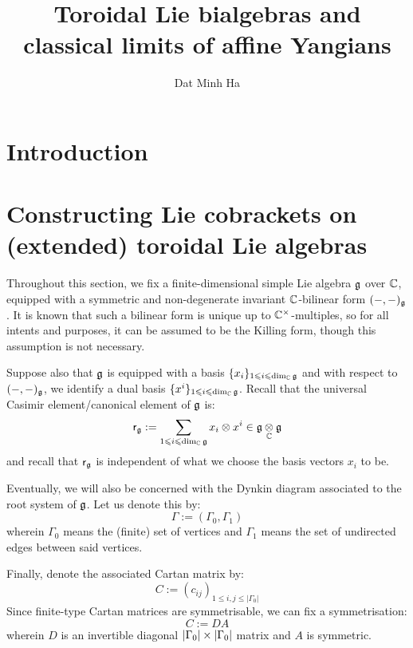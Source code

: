 

\setcounter{section}{-1}





    \title{Toroidal Lie bialgebras and classical limits of affine Yangians}
    
    \author{Dat Minh Ha}
    \maketitle
    
    \begin{abstract}
        
    \end{abstract}
    
    {
    \hypersetup{} 
    \tableofcontents %
    \listoftodos
    }

    \section{Introduction}

    \section{Constructing Lie cobrackets on (extended) toroidal Lie algebras}
        \begin{convention} \label{conv: a_fixed_finite_dimensional_simple_lie_algebra}
            Throughout this section, we fix a finite-dimensional simple Lie algebra $\mathfrak{g}$ over $\mathbb{C}$, equipped with a symmetric and non-degenerate invariant $\mathbb{C}$-bilinear form $(-, -)_{\mathfrak{g}}$. It is known that such a bilinear form is unique up to $\bbC^{\x}$-multiples, so for all intents and purposes, it can be assumed to be the Killing form, though this assumption is not necessary. 

            Suppose also that $\mathfrak{g}$ is equipped with a basis $\{x_i\}_{1 \leqslant i \leqslant \dim_{\mathbb{C}} \mathfrak{g}}$ and with respect to $(-, -)_{\mathfrak{g}}$, we identify a dual basis $\{x^i\}_{1 \leqslant i \leqslant \dim_{\mathbb{C}} \mathfrak{g}}$. Recall that the universal Casimir element/canonical element of $\mathfrak{g}$ is:
                $$\sfr_{\g} := \sum_{1 \leq i \leq \dim_{\bbC} \g} x_i \tensor x^i \in \g \tensor_{\bbC} \g$$
            and recall that $\mathsf{r}_{\mathfrak{g}}$ is independent of what we choose the basis vectors $x_i$ to be.

            Eventually, we will also be concerned with the Dynkin diagram associated to the root system of $\mathfrak{g}$. Let us denote this by:
                $$\Gamma := (\Gamma_0, \Gamma_1)$$
            wherein $\Gamma_0$ means the (finite) set of vertices and $\Gamma_1$ means the set of undirected edges between said vertices. 

            Finally, denote the associated Cartan matrix by:
                $$C := (c_{ij})_{1 \leq i, j \leq |\Gamma_0|}$$
            Since finite-type Cartan matrices are symmetrisable, we can fix a symmetrisation:
                $$C := D A$$
            wherein $D$ is an invertible diagonal $|\Gamma_0| \x |\Gamma_0|$ matrix and $A$ is symmetric. 
        \end{convention}

